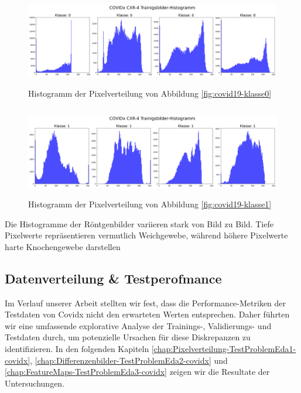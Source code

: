 \begin{figure}[ht]
    \centering
    \includegraphics[width=\linewidth, height=4cm]{01-images/03-data/covid19-klasse0-hist.png}
    \caption{Histogramm der Pixelverteilung von Abbildung \ref{fig:covid19-klasse0}}
    \label{fig:covid19-klasse0-hist}
\end{figure}

\begin{figure}[ht]
    \centering
    \includegraphics[width=\linewidth, height=4cm]{01-images/03-data/covid19-klasse1-hist.png}
    \caption{Histogramm der Pixelverteilung von Abbildung \ref{fig:covid19-klasse1}}
    \label{fig:covid19-klasse1-hist}
\end{figure}

Die Histogramme der Röntgenbilder variieren stark von Bild zu Bild. Tiefe Pixelwerte repräsentieren vermutlich Weichgewebe, während höhere Pixelwerte harte Knochengewebe darstellen

\subsection{Datenverteilung \& Testperofmance} \label{chap:Datenverteilung-Testperformance-covidx}

Im Verlauf unserer Arbeit stellten wir fest, dass die Performance-Metriken der Testdaten von Covidx nicht den erwarteten Werten entsprechen. Daher führten wir eine umfassende explorative Analyse der Trainings-, Validierungs- und Testdaten durch, um potenzielle Ursachen für diese Diskrepanzen zu identifizieren. In den folgenden Kapiteln \ref{chap:Pixelverteilung-TestProblemEda1-covidx}, \ref{chap:Differenzenbilder-TestProblemEda2-covidx} und \ref{chap:FeatureMaps-TestProblemEda3-covidx} zeigen wir die Resultate der Untersuchungen.

